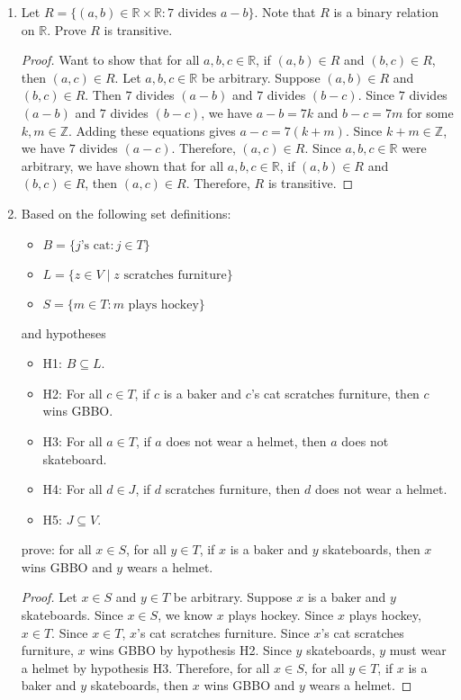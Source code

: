 \documentclass{article}
\newcommand\Z{\mathbb{Z}}
\newcommand\R{\mathbb{R}}
\begin{document}
\begin{enumerate}
\newpage

\item Let $R = \{(a,b) \in \mathbb{R} \times \mathbb{R} : 7 \text{ divides } a-b\}$. Note that $R$ is a binary relation on $\mathbb{R}$. Prove $R$ is transitive.

\begin{proof}
    Want to show that for all $a,b,c \in \R$, if $(a,b) \in R$ and $(b,c) \in R$, then $(a,c) \in R$. Let $a,b,c \in \R$ be arbitrary. Suppose $(a,b) \in R$ and $(b,c) \in R$. Then $7$ divides $(a-b)$ and $7$ divides $(b-c)$. Since $7$ divides $(a-b)$ and $7$ divides $(b-c)$, we have $a-b = 7k$ and $b-c = 7m$ for some $k,m \in \Z$. Adding these equations gives $a-c = 7(k+m)$. Since $k+m \in \Z$, we have $7$ divides $(a-c)$. Therefore, $(a,c) \in R$. Since $a,b,c \in \R$ were arbitrary, we have shown that for all $a,b,c \in \R$, if $(a,b) \in R$ and $(b,c) \in R$, then $(a,c) \in R$. Therefore, $R$ is transitive.
\end{proof}

\newpage

\item Based on the following set definitions:
\begin{itemize}
\item $B = \{ j\text{'s cat} : j \in T \}$
\item $L = \{ z \in V \mid z \text{ scratches furniture} \}$
\item $S = \{ m \in T : m \text{ plays hockey} \}$
\end{itemize}
and hypotheses
\begin{itemize}
\item H1: $B \subseteq L$.
\item H2: For all $c \in T$, if $c$ is a baker and $c$'s cat scratches furniture, then $c$ wins GBBO.\@
\item H3: For all $a \in T$, if $a$ does not wear a helmet, then $a$ does not skateboard.
\item H4: For all $d \in J$, if $d$ scratches furniture, then $d$ does not wear a helmet.
\item H5: $J \subseteq V$.
\end{itemize}
prove: for all $x \in S$, for all $y \in T$, if $x$ is a baker and $y$ skateboards, then $x$ wins GBBO and $y$ wears a helmet.

\begin{proof}
    Let $x \in S$ and $y \in T$ be arbitrary. Suppose $x$ is a baker and $y$ skateboards. Since $x \in S$, we know $x$ plays hockey. Since $x$ plays hockey, $x \in T$. Since $x \in T$, $x$'s cat scratches furniture. Since $x$'s cat scratches furniture, $x$ wins GBBO by hypothesis H2. Since $y$ skateboards, $y$ must wear a helmet by hypothesis H3. Therefore, for all $x \in S$, for all $y \in T$, if $x$ is a baker and $y$ skateboards, then $x$ wins GBBO and $y$ wears a helmet.
\end{proof}

\end{enumerate}
\end{document}
